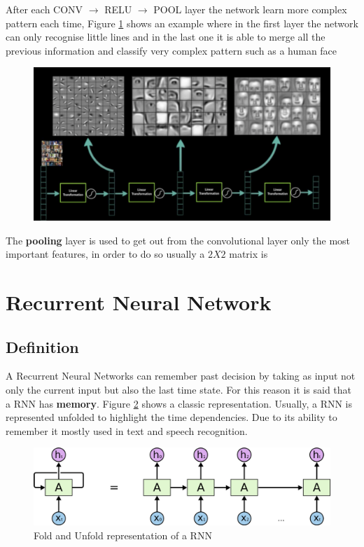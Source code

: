 \documentclass[11pt]{article}
\begin{document}
After each CONV $\rightarrow$ RELU $\rightarrow$ POOL layer the network learn more complex pattern each time, Figure \ref{fig: cnn_faces} shows an example where in the first layer the network can only recognise little lines and in the last one it is able to merge all the previous information and classify very complex pattern such as a human face
\begin{figure}[H]
\centering
\includegraphics[scale=0.35]{images/cnn_faces}
\caption{}
\label{fig: cnn_faces}	
\end{figure}
The \textbf{pooling} layer is used to get out from the convolutional layer only the most important features, in order to do so usually a $2X2$ matrix is 
\section{Recurrent Neural Network}
\subsection{Definition}
A Recurrent Neural Networks can remember past decision by taking as input not only the current input but also the last time state. For this reason it is said that a RNN has \textbf{memory}. Figure \ref{fig: RNN} shows a classic representation. Usually, a RNN is represented unfolded to highlight the time dependencies. Due to its ability to remember it mostly used in text and speech recognition.
\begin{figure}[h]
\centering
\includegraphics[scale=0.2]{images/rnn}	
\caption{Fold and Unfold representation of a RNN}
\label{fig: RNN}
\end{figure}
\end{document}
